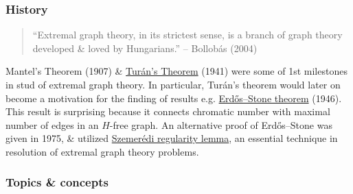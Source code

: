 \documentclass{article}
\begin{document}
\subsubsection{History}

\begin{quote}
	``Extremal graph theory, in its strictest sense, is a branch of graph theory developed \& loved by Hungarians.'' -- {\sc Bollob\'as} (2004)
\end{quote}
Mantel's Theorem (1907) \& \href{https://en.wikipedia.org/wiki/Tur%C3%A1n%27s_theorem}{Tur\'an's Theorem} (1941) were some of 1st milestones in stud of extremal graph theory. In particular, Tur\'an's theorem would later on become a motivation for the finding of results e.g. \href{https://en.wikipedia.org/wiki/Erd%C5%91s%E2%80%93Stone_theorem}{Erd\H{o}s--Stone theorem} (1946). This result is surprising because it connects chromatic number with maximal number of edges in an $H$-free graph. An alternative proof of Erd\H{o}s--Stone was given in 1975, \& utilized \href{https://en.wikipedia.org/wiki/Szemer%C3%A9di_regularity_lemma}{Szemer\'edi regularity lemma}, an essential technique in resolution of extremal graph theory problems.

\subsubsection{Topics \& concepts}
\end{document}
